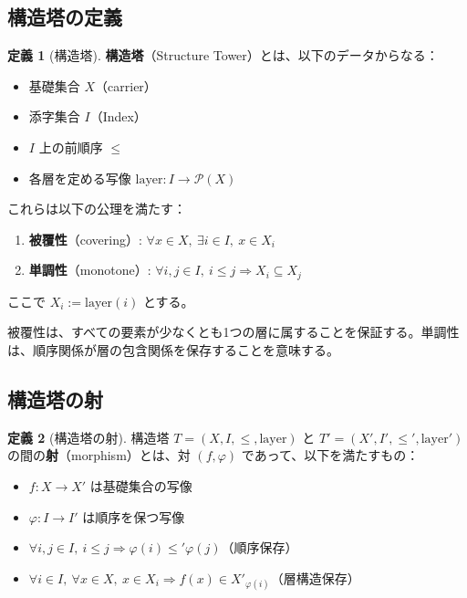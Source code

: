 \documentclass[a4paper,12pt]{ltjsarticle}
\theoremstyle{definition}
\newtheorem{definition}{定義}[section]
\begin{document}
\subsection{構造塔の定義}

\begin{definition}[構造塔]
\label{def:structure-tower}
\textbf{構造塔}（Structure Tower）とは、以下のデータからなる：
\begin{itemize}
\item 基礎集合 $X$（carrier）
\item 添字集合 $I$（Index）
\item $I$ 上の前順序 $\leq$
\item 各層を定める写像 $\mathrm{layer}: I \to \mathcal{P}(X)$
\end{itemize}
これらは以下の公理を満たす：
\begin{enumerate}
\item \textbf{被覆性}（covering）: $\forall x \in X,\ \exists i \in I,\ x \in X_i$
\item \textbf{単調性}（monotone）: $\forall i, j \in I,\ i \leq j \Rightarrow X_i \subseteq X_j$
\end{enumerate}
ここで $X_i := \mathrm{layer}(i)$ とする。
\end{definition}

被覆性は、すべての要素が少なくとも1つの層に属することを保証する。単調性は、順序関係が層の包含関係を保存することを意味する。

\subsection{構造塔の射}

\begin{definition}[構造塔の射]
\label{def:tower-morphism}
構造塔 $T = (X, I, \leq, \mathrm{layer})$ と $T' = (X', I', \leq', \mathrm{layer}')$ の間の\textbf{射}（morphism）とは、対 $(f, \varphi)$ であって、以下を満たすもの：
\begin{itemize}
\item $f: X \to X'$ は基礎集合の写像
\item $\varphi: I \to I'$ は順序を保つ写像
\item $\forall i, j \in I,\ i \leq j \Rightarrow \varphi(i) \leq' \varphi(j)$（順序保存）
\item $\forall i \in I,\ \forall x \in X,\ x \in X_i \Rightarrow f(x) \in X'_{\varphi(i)}$（層構造保存）
\end{itemize}
\end{definition}
\end{document}
